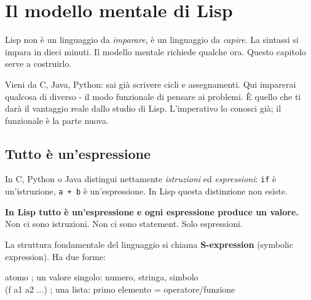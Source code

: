 ﻿%

\chapter{Il modello mentale di Lisp}

\begin{intuizione}
Lisp non è un linguaggio da \emph{imparare}, è un linguaggio da
\emph{capire}. La sintassi si impara in dieci minuti. Il modello mentale
richiede qualche ora. Questo capitolo serve a costruirlo.

\medskip
Vieni da C, Java, Python: sai già scrivere cicli e assegnamenti.
Qui imparerai qualcosa di diverso - il modo funzionale di pensare
ai problemi. È quello che ti darà il vantaggio reale dallo studio di Lisp.
L'imperativo lo conosci già; il funzionale è la parte nuova.
\end{intuizione}

\vspace{4pt}

\section{Tutto è un'espressione}

In C, Python o Java distingui nettamente \emph{istruzioni} ed
\emph{espressioni}: \texttt{if} è un'istruzione, \texttt{a + b} è
un'espressione. In Lisp questa distinzione non esiste.

\begin{intuizione}
\textbf{In Lisp tutto è un'espressione e ogni espressione produce un valore.}\\
Non ci sono istruzioni. Non ci sono statement. Solo espressioni.
\end{intuizione}


La struttura fondamentale del linguaggio si chiama \textbf{S-expression}
(symbolic expression). Ha due forme:

\begin{sintassi}
atomo          ; un valore singolo: numero, stringa, simbolo\\
(f a1 a2 ...)  ; una lista: primo elemento = operatore/funzione
\end{sintassi}


